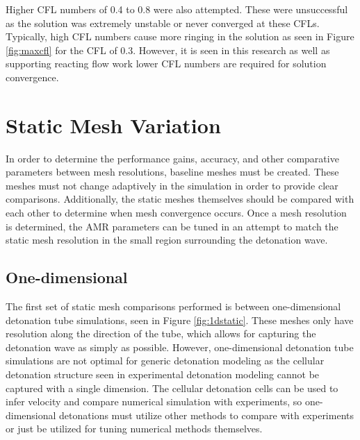Higher CFL numbers of 0.4 to 0.8 were also attempted. These were unsuccessful as the solution was extremely unstable or never converged at these CFLs. Typically, high CFL numbers cause more ringing in the solution as seen in Figure \ref{fig:maxcfl} for the CFL of 0.3. However, it is seen in this research as well as supporting reacting flow work \cite{ajaero}\cite{kim}\cite{marcantoni} lower CFL numbers are required for solution convergence. 

\section{Static Mesh Variation}
\label{sec:staticvar}
In order to determine the performance gains, accuracy, and other comparative parameters between mesh resolutions, baseline meshes must be created. These meshes must not change adaptively in the simulation in order to provide clear comparisons. Additionally, the static meshes themselves should be compared with each other to determine when mesh convergence occurs. Once a mesh resolution is determined, the AMR parameters can be tuned in an attempt to match the static mesh resolution in the small region surrounding the detonation wave. 


\subsection{One-dimensional}
\label{sec:1dstatic}

The first set of static mesh comparisons performed is between one-dimensional detonation tube simulations, seen in Figure \ref{fig:1dstatic}. These meshes only have resolution along the direction of the tube, which allows for capturing the detonation wave as simply as possible. However,  one-dimensional detonation tube simulations are not optimal for generic detonation modeling as the cellular detonation structure seen in experimental detonation modeling cannot be captured with a single dimension. The cellular detonation cells can be used to infer velocity and compare numerical simulation with experiments, so one-dimensional detonations must utilize other methods to compare with experiments or just be utilized for tuning numerical methods themselves. 

